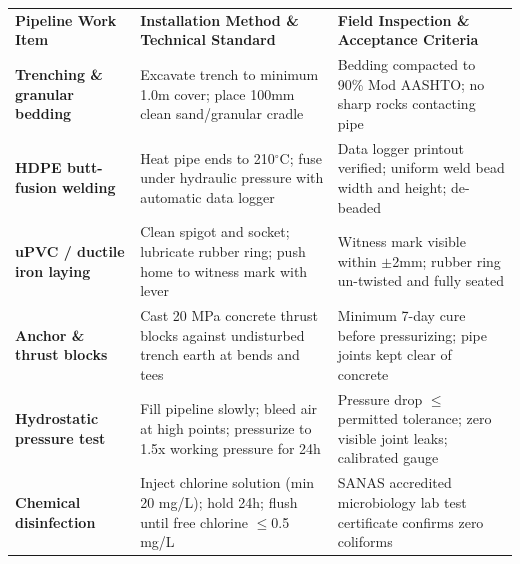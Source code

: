 {\fontsize{7.7pt}{9.8pt}\selectfont
\renewcommand{\arraystretch}{1.23}
\noindent
\begin{tabularx}{\textwidth}{@{}p{3.3cm} p{6.6cm} X@{}}
\rowcolor{mhnavy}
{\color{white}\bfseries Pipeline Work Item} & {\color{white}\bfseries Installation Method \& Technical Standard} & {\color{white}\bfseries Field Inspection \& Acceptance Criteria} \\
\rowcolor{mhbluelight}
\bfseries Trenching \& granular bedding & Excavate trench to minimum 1.0m cover; place 100mm clean sand/granular cradle & Bedding compacted to 90\% Mod AASHTO; no sharp rocks contacting pipe \\
\bfseries HDPE butt-fusion welding & Heat pipe ends to 210$^\circ$C; fuse under hydraulic pressure with automatic data logger & Data logger printout verified; uniform weld bead width and height; de-beaded \\
\rowcolor{mhbluelight}
\bfseries uPVC / ductile iron laying & Clean spigot and socket; lubricate rubber ring; push home to witness mark with lever & Witness mark visible within $\pm$2mm; rubber ring un-twisted and fully seated \\
\bfseries Anchor \& thrust blocks & Cast 20 MPa concrete thrust blocks against undisturbed trench earth at bends and tees & Minimum 7-day cure before pressurizing; pipe joints kept clear of concrete \\
\rowcolor{mhbluelight}
\bfseries Hydrostatic pressure test & Fill pipeline slowly; bleed air at high points; pressurize to 1.5x working pressure for 24h & Pressure drop $\le$ permitted tolerance; zero visible joint leaks; calibrated gauge \\
\bfseries Chemical disinfection & Inject chlorine solution (min 20 mg/L); hold 24h; flush until free chlorine $\le$0.5 mg/L & SANAS accredited microbiology lab test certificate confirms zero coliforms \\
\end{tabularx}
\renewcommand{\arraystretch}{1}
}

\vfill

